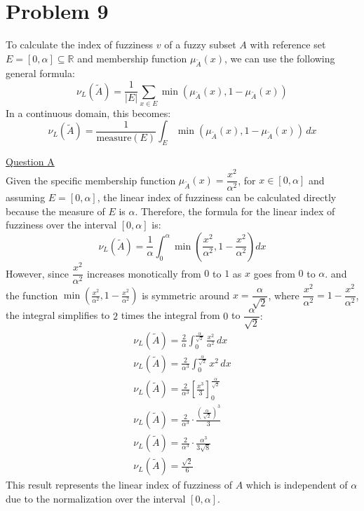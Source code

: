 \section{Problem 9}
To calculate the index of fuzziness $v$ of a fuzzy subset $A$ with reference set $E = [0, \alpha] \subseteq \mathbb{R}$ and membership function $\mu_{\tilde{A}}(x)$, we can use the following general formula:
\begin{equation}
	\nu_L(\tilde{A}) = \frac{1}{|E|} \sum_{x \in E} \min(\mu_{\tilde{A}}(x), 1 - \mu_{\tilde{A}}(x))
\end{equation}
In a continuous domain, this becomes:
\begin{equation}
	\nu_L(\tilde{A}) = \frac{1}{\text{measure}(E)} \int_{E} \min(\mu_{\tilde{A}}(x), 1 - \mu_{\tilde{A}}(x)) \, dx
\end{equation}

\underline{Question A}\\
Given the specific membership function $\mu_{\tilde{A}}(x) = \dfrac{x^2}{\alpha^2}$, for $x \in [0, \alpha]$ and assuming $E = [0, \alpha]$, the linear index of fuzziness can be calculated directly because the measure of $E$ is $\alpha$. Therefore, the formula for the linear index of fuzziness over the interval 
$[0,\alpha]$ is:
\begin{equation}
	\nu_L(\tilde{A}) = \dfrac{1}{\alpha} \int_{0}^{\alpha} \min\left( \dfrac{x^2}{\alpha^2}, 1 - \dfrac{x^2}{\alpha^2} \right) dx
\end{equation}
However, since $\dfrac{x^2}{\alpha^2}$ increases monotically from $0$ to $1$ as $x$ goes from $0$ to $\alpha$. and the function $\min\left(\frac{x^2}{\alpha^2}, 1 - \frac{x^2}{\alpha^2}\right)
$ is symmetric around $x = \dfrac{\alpha}{\sqrt{2}}$, where $\dfrac{x^2}{\alpha^2} = 1 - \dfrac{x^2}{\alpha^2}$, the integral simplifies to $2$ times the integral from $0$ to $\dfrac{\alpha}{\sqrt{2}}:$
\\
\begin{gather}
	\nu_L(\tilde{A}) = \frac{2}{\alpha} \int_{0}^{\frac{\alpha}{\sqrt{2}}} \frac{x^2}{\alpha^2} \, dx \\
	\nu_L(\tilde{A}) = \frac{2}{\alpha^3} \int_{0}^{\frac{\alpha}{\sqrt{2}}} x^2 \, dx\\
	\nu_L(\tilde{A}) = \frac{2}{\alpha^3} \left[ \frac{x^3}{3} \right]_{0}^{\frac{\alpha}{\sqrt{2}}} \\
	\nu_L(\tilde{A}) = \frac{2}{\alpha^3} \cdot \frac{\left(\frac{\alpha}{\sqrt{2}}\right)^3}{3}\\
	\nu_L(\tilde{A}) = \frac{2}{\alpha^3} \cdot \frac{\alpha^3}{3\sqrt{8}} \\
	\nu_L(\tilde{A}) = \frac{\sqrt{2}}{6}
\end{gather}
This result represents the linear index of fuzziness of $A$ which is independent of $\alpha$ due to the normalization over the interval $[0,\alpha]$.
\vspace{5mm}

